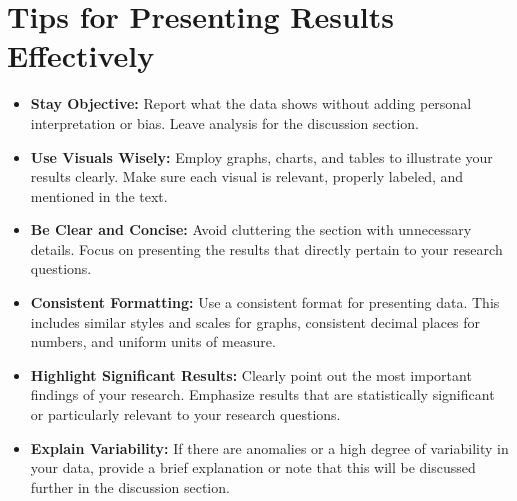 \clearpage

\section{Tips for Presenting Results Effectively}
\begin{itemize}
    \item \textbf{Stay Objective:} Report what the data shows without adding personal interpretation or bias. Leave analysis for the discussion section.
    \item \textbf{Use Visuals Wisely:} Employ graphs, charts, and tables to illustrate your results clearly. Make sure each visual is relevant, properly labeled, and mentioned in the text.
    \item \textbf{Be Clear and Concise:} Avoid cluttering the section with unnecessary details. Focus on presenting the results that directly pertain to your research questions.
    \item \textbf{Consistent Formatting:} Use a consistent format for presenting data. This includes similar styles and scales for graphs, consistent decimal places for numbers, and uniform units of measure.
    \item \textbf{Highlight Significant Results:} Clearly point out the most important findings of your research. Emphasize results that are statistically significant or particularly relevant to your research questions.
    \item \textbf{Explain Variability:} If there are anomalies or a high degree of variability in your data, provide a brief explanation or note that this will be discussed further in the discussion section.
\end{itemize}

